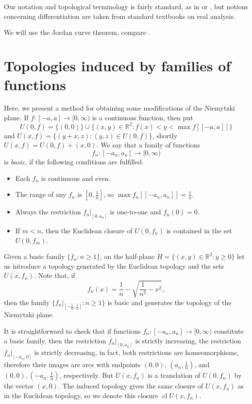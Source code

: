 \documentclass[a4paper,12pt,leqno]{amsart}
\newcommand{\bbR}{\mathbb{R}}
\newcommand{\cl}{\operatorname{cl}}
\theoremstyle{definition}
\renewcommand{\geq}{\geqslant}
\begin{document}
Our notation and topological terminology is fairly standard, as in \cite{Engelking} or \cite{Seebach}, but notions concerning differentiation are taken from standard textbooks on real analysis.

We will use the Jordan curve theorem, compare \cite[p. 31]{Moise}. 

\section{Topologies induced by families of functions}
Here, we present a method for obtaining some modifications of the Niemytzki plane.
If $f\colon [-a,a]\to[0,\infty)$ is a continuous function, then put
$$U(0,f)=\{(0,0)\}\cup\{(x,y)\in\bbR^2\colon f(x)< y<\max f[[-a,a]]\}$$
and  $U(x,f)=\{(y+x,z):(y,z)\in U(0,f)\}$, shortly $U(x,f)=U(0,f)+(x,0)$.
We say that a  family of functions
$$f_n\colon [-a_n,a_n]\to[0,\infty)$$
is \emph{basic}, if  the following conditions are fulfilled.
\begin{itemize}
\item Each $f_n$ is continuous and  even.
\item The range of any $f_n$ is $[0,\frac1n]$, so $\max f_n[[-a_n,a_n]]=\frac1n$.
\item Always the restriction  $f_n|_{[0,a_n]}$ is one-to-one and $f_n(0)=0$.
\item If $m<n$, then the Euclidean closure of $U(0,f_n)$ is contained in the set $U(0,f_m)$.
\end{itemize}
Given a basic family $\{f_n\colon n\geq 1\}$,  on the half-plane $H=\{(x,y)\in\bbR^2\colon y\geq 0\}$ let us introduce a topology generated by  the Euclidean topology and the sets  $U(x,f_n)$.
Note that, if
$$\textstyle f_n(x)=\frac1n-\sqrt{\frac1{n^2}-x^2},$$
then the family $\{f_n|_{[-\frac1n,\frac1n]}\colon n\geq 1\}$ is basic and generates the topology of the Niemytzki plane.

It is straightforward  to check that if functions $f_n\colon [-a_n,a_n]\to[0,\infty)$ constitute a basic family, then the restriction  $f_n|_{[0,a_n]}$ is strictly increasing, the restriction $f_n|_{[-a_n,0]}$ is strictly decreasing, in fact, both restrictions  are homeomorphisms, therefore their images are arcs with endpoints $(0,0)$, $(a_n,\frac1n)$, and $(0,0),(-a_n,\frac1n)$, respectively.
But $U(x,f_n)$ is a translation of $U(0,f_n)$ by the vector $(x,0)$.
The induced topology gives the same  closure of  $U(x,f_n)$ as in the Euclidean topology, so we denote this closure $\cl U(x,f_n)$.
\end{document}
